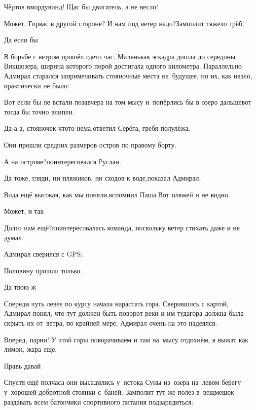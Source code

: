 \diagdash Чёртов вмордувинд! Щас бы двигатель, а не весло!

\diagdash Может, Гирвас в другой стороне? И нам под ветер надо?\mdash Замполит тяжело грёб.

\diagdash Да если бы\myldots{}

\vspace{0.75em}
\myldots{}В борьбе с ветром прошёл где\sdash то час. Маленькая эскадра дошла до середины Викшозера, ширина которого порой достигала одного километра. Параллельно Адмирал старался запримечивать стояночные места на~будущее, но их, как назло, практически не было:

\diagdash Вот если бы не встали позавчера на том мысу и~попёрлись бы в озеро дальше\mdash вот тогда бы точно влипли.

\diagdash Да-а-а, стояночек что\sdash то нема,\mdash ответил Серёга, гребя полулёжа.

Они прошли средних размеров остров по правому борту.

\diagdash А на острове?\mdash поинтересовался Руслан.

\diagdash Да тоже, гляди, ни пляжиков, ни сходов к воде,\mdash показал Адмирал.

\diagdash Вода ещё высокая, как мы поняли,\mdash вспомнил Паша.\mdash Вот пляжей и не видно.

\diagdash Может, и так\myldots{}

\diagdash Долго нам ещё?\mdash поинтересовалась команда, поскольку ветер стихать даже и не думал.

Адмирал сверился с GPS:

\diagdash Половину прошли только.

\diagdash Да твою ж\myldots{}

\vspace{1em}
\myldots{}Спереди чуть левее по курсу начала нарастать гора. Сверившись с картой, Адмирал понял, что тут должен быть поворот реки и им туда\mdash гора должна была скрыть их от~ветра, по крайней мере, Адмирал очень на это надеялся:

\diagdash Вперёд, парни! У этой горы поворачиваем и там на~мысу отдохнём, я выжат как лимон, жара ещё.

\diagdash Правь давай\myldots{}

Спустя ещё полчаса они высадились у~истока Суны из~озера на~левом берегу у~хорошей добротной стоянки с~баней. Замполит тут же полез в~вещмешок раздавать всем батончики спортивного питания подзарядиться:

